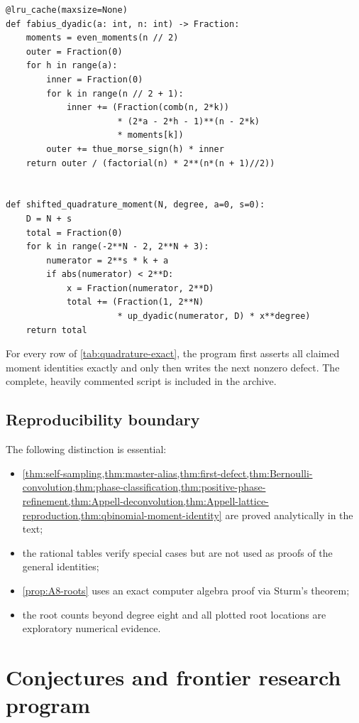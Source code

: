 \documentclass[11pt]{article}
\numberwithin{equation}{section}
\theoremstyle{definition}
\theoremstyle{remark}
\begin{document}
\begin{lstlisting}[style=frontiercode,caption={Exact dyadic Fabius evaluation and shifted moment quadrature.}]
@lru_cache(maxsize=None)
def fabius_dyadic(a: int, n: int) -> Fraction:
    moments = even_moments(n // 2)
    outer = Fraction(0)
    for h in range(a):
        inner = Fraction(0)
        for k in range(n // 2 + 1):
            inner += (Fraction(comb(n, 2*k))
                      * (2*a - 2*h - 1)**(n - 2*k)
                      * moments[k])
        outer += thue_morse_sign(h) * inner
    return outer / (factorial(n) * 2**(n*(n + 1)//2))


def shifted_quadrature_moment(N, degree, a=0, s=0):
    D = N + s
    total = Fraction(0)
    for k in range(-2**N - 2, 2**N + 3):
        numerator = 2**s * k + a
        if abs(numerator) < 2**D:
            x = Fraction(numerator, 2**D)
            total += (Fraction(1, 2**N)
                      * up_dyadic(numerator, D) * x**degree)
    return total
\end{lstlisting}

For every row of \cref{tab:quadrature-exact}, the program first asserts all claimed moment identities exactly and only then writes the next nonzero defect.  The complete, heavily commented script is included in the archive.

\subsection{Reproducibility boundary}

The following distinction is essential:
\begin{itemize}
\item \cref{thm:self-sampling,thm:master-alias,thm:first-defect,thm:Bernoulli-convolution,thm:phase-classification,thm:positive-phase-refinement,thm:Appell-deconvolution,thm:Appell-lattice-reproduction,thm:qbinomial-moment-identity} are proved analytically in the text;
\item the rational tables verify special cases but are not used as proofs of the general identities;
\item \cref{prop:A8-roots} uses an exact computer algebra proof via Sturm's theorem;
\item the root counts beyond degree eight and all plotted root locations are exploratory numerical evidence.
\end{itemize}

\section{Conjectures and frontier research program}
\label{sec:frontier}
\end{document}
